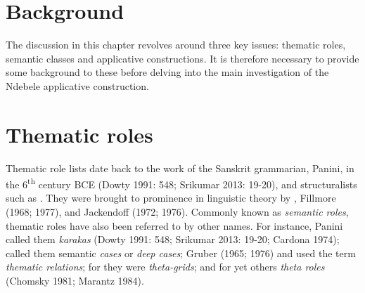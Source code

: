 \documentclass[output=paper]{langsci/langscibook}
\begin{document}
\section{ Background}

The discussion in this chapter revolves around three key issues: thematic roles, semantic classes and applicative constructions. It is therefore necessary to provide some background to these before delving into the main investigation of the Ndebele applicative construction. 

\section{Thematic roles}

Thematic role lists date back to the work of the Sanskrit grammarian, Panini, in the 6\textsuperscript{th} century BCE (Dowty 1991: 548; Srikumar 2013: 19-20), and structuralists such as \citet{Blake1930}. They were brought to prominence in linguistic theory by \citet{Gruber1965}, Fillmore (1968; 1977), and Jackendoff (1972; 1976). Commonly known as \textit{semantic roles}, thematic roles have also been referred to by other names. For instance, Panini called them \textit{karakas }(Dowty 1991: 548; Srikumar 2013: 19-20; Cardona 1974); \citet{Fillmore1968} called them semantic \textit{cases} or \textit{deep cases}; Gruber (1965; 1976) and \citet{Jackendoff1972} used the term \textit{thematic relations}; for \citet{Stowell1981} they were \textit{theta-grids}; and for yet others \textit{theta roles} (Chomsky 1981; Marantz 1984).           
\end{document}
